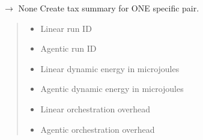 \documentclass[letterpaper,10pt,english]{sphinxmanual}
\begin{document}
\begin{fulllineitems}
\begin{fulllineitems}
\label{\detokenize{core.database.repositories.tax:core.database.repositories.tax.TaxRepository.create_tax_summary_for_pair}}
\pysigstartsignatures
\pysiglinewithargsret
{}
{\sphinxparamcomma {}\sphinxparamcomma {}\sphinxparamcomma {}\sphinxparamcomma {}\sphinxparamcomma {}}
{{ $\rightarrow$ None}}
\pysigstopsignatures
\sphinxAtStartPar
Create tax summary for ONE specific pair.
\begin{quote}\begin{description}
\begin{itemize}
\item {} 
\sphinxAtStartPar
{} \textendash{} Linear run ID

\item {} 
\sphinxAtStartPar
{} \textendash{} Agentic run ID

\item {} 
\sphinxAtStartPar
{} \textendash{} Linear dynamic energy in microjoules

\item {} 
\sphinxAtStartPar
{} \textendash{} Agentic dynamic energy in microjoules

\item {} 
\sphinxAtStartPar
{} \textendash{} Linear orchestration overhead

\item {} 
\sphinxAtStartPar
{} \textendash{} Agentic orchestration overhead

\end{itemize}

\end{description}\end{quote}

\end{fulllineitems}


\end{fulllineitems}
\end{document}
